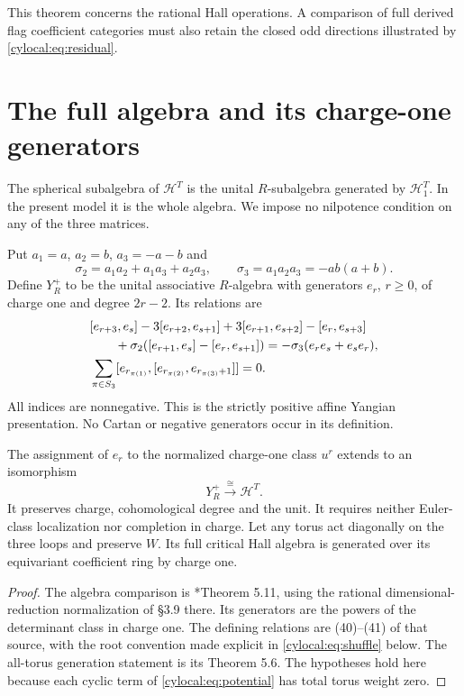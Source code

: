This theorem concerns the rational Hall operations. A comparison
of full derived flag coefficient categories must also retain the
closed odd directions illustrated by \eqref{cylocal:eq:residual}.

\section{The full algebra and its charge-one generators}
\label{cylocal:sec:yangian}

The spherical subalgebra of $\mathcal H^T$ is the unital
$R$-subalgebra generated by $\mathcal H_1^T$. In the present model
it is the whole algebra. We impose no nilpotence condition on any
of the three matrices.

Put $a_1=a$, $a_2=b$, $a_3=-a-b$ and
\[
 \sigma_2=a_1a_2+a_1a_3+a_2a_3,
 \qquad \sigma_3=a_1a_2a_3=-ab(a+b).
\]
Define $Y_R^+$ to be the unital associative $R$-algebra with
generators $e_r$, $r\geq0$, of charge one and degree $2r-2$.
Its relations are
\begin{align}
 &[e_{r+3},e_s]-3[e_{r+2},e_{s+1}]
     +3[e_{r+1},e_{s+2}]-[e_r,e_{s+3}]\notag\\
 &\hspace{2em}
   +\sigma_2([e_{r+1},e_s]-[e_r,e_{s+1}])
       =-\sigma_3(e_re_s+e_se_r),
       \label{cylocal:eq:yangian-quadratic}\\
 &\sum_{\pi\in S_3}
   [e_{r_{\pi(1)}},[e_{r_{\pi(2)}},e_{r_{\pi(3)}+1}]]=0.
       \label{cylocal:eq:yangian-serre}
\end{align}
All indices are nonnegative. This is the strictly positive affine
Yangian presentation. No Cartan or negative generators occur in
its definition.

\begin{theorem}[Davison]\label{cylocal:thm:yangian}
The assignment of $e_r$ to the normalized charge-one class $u^r$
extends to an isomorphism
\[
 Y_R^+\xrightarrow{\ \cong\ }\mathcal H^T.
\]
It preserves charge, cohomological degree and the unit. It requires
neither Euler-class localization nor completion in charge.
Let any torus act diagonally on the three loops and preserve $W$.
Its full critical Hall algebra is generated over its equivariant
coefficient ring by charge one.
\end{theorem}
\begin{proof}
The algebra comparison is \cite{cylocal:Davison}*{Theorem 5.11},
using the rational dimensional-reduction normalization of \S3.9
there. Its generators are the powers of the determinant class in
charge one. The defining relations are (40)--(41) of that source,
with the root convention made explicit in
\eqref{cylocal:eq:shuffle} below. The all-torus generation statement
is its Theorem 5.6. The hypotheses hold here because each cyclic
term of \eqref{cylocal:eq:potential} has total torus weight zero.
\end{proof}

